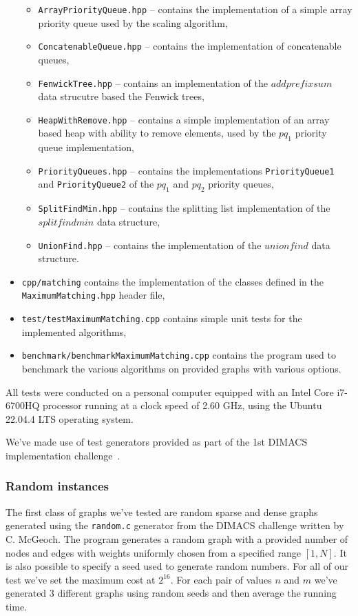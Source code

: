 \begin{itemize}
\begin{itemize}
        \item \texttt{ArrayPriorityQueue.hpp} – contains the implementation of a simple array priority queue used by the scaling algorithm,
        \item \texttt{ConcatenableQueue.hpp} – contains the implementation of concatenable queues,
        \item \texttt{FenwickTree.hpp} – contains an implementation of the $addprefixsum$ data strucutre based the Fenwick trees,
        \item \texttt{HeapWithRemove.hpp} – contains a simple implementation of an array based heap with ability to remove elements, used by the $pq_1$ priority queue implementation,
        \item \texttt{PriorityQueues.hpp} – contains the implementations \texttt{PriorityQueue1} and \texttt{PriorityQueue2} of the $pq_1$ and $pq_2$ priority queues,
        \item \texttt{SplitFindMin.hpp} – contains the splitting list implementation of the $splitfindmin$ data structure,
        \item \texttt{UnionFind.hpp} – contains the implementation of the $unionfind$ data structure.
    \end{itemize}
    \item \texttt{cpp/matching} contains the implementation of the classes defined in the \texttt{MaximumMatching.hpp} header file,
    \item \texttt{test/testMaximumMatching.cpp} contains simple unit tests for the implemented algorithms,
    \item \texttt{benchmark/benchmarkMaximumMatching.cpp} contains the program used to benchmark the various algorithms on provided graphs with various options.
\end{itemize}

All tests were conducted on a personal computer equipped with an Intel Core i7-6700HQ processor running at a clock speed of 2.60 GHz, using the Ubuntu 22.04.4 LTS operating system.

We've made use of test generators provided as part of the 1st DIMACS implementation challenge~\cite{rutgersDIMACSImplementation}.

\subsubsection*{Random instances}

The first class of graphs we've tested are random sparse and dense graphs generated using the \texttt{random.c} generator from the DIMACS challenge written by C. McGeoch. The program generates a random graph with a provided number of nodes and edges with weights uniformly chosen from a specified range $[1, N]$. It is also possible to specify a seed used to generate random numbers. For all of our test we've set the maximum cost at $2^{16}$. For each pair of values $n$ and $m$ we've generated $3$ different graphs using random seeds and then average the running time.

